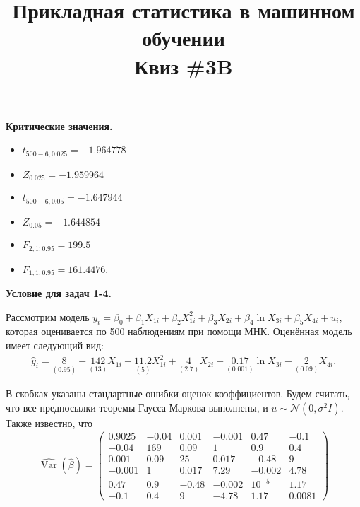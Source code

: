 \documentclass[10pt, a4paper]{extarticle}
\title{{\normalsize Прикладная статистика в машинном обучении} \\ \vspace{0.5em} Квиз \#3B}
\author{\rule{15cm}{0.4pt}}
\DeclareMathOperator{\Var}{Var}
\begin{document}
	
	\maketitle
	
	\begin{center}
		{\large \textbf{Критические значения.}}
		\begin{multicols}{3}
			\begin{itemize}
				\item $t_{500-6; 0.025} = -1.964778$
				\item $Z_{0.025} = -1.959964$
				\item $t_{500-6, 0.05} = -1.647944$
				\item $Z_{0.05} = -1.644854$
				\item $F_{2, 1; 0.95} = 199.5$
				\item $F_{1, 1; 0.95} = 161.4476$.
			\end{itemize}
		\end{multicols}	
	\end{center}
	\vspace{1em}
	
	\begin{center}
	{\large \textbf{Условие для задач 1-4.}}
	\end{center}
	
	Рассмотрим модель $y_i = \beta_0 + \beta_1X_{1i} + \beta_2X^2_{1i} + \beta_3X_{2i} + \beta_4\ln X_{3i} + \beta_5X_{4i} + u_i$, которая оценивается по 500 наблюдениям при помощи МНК. Оценённая модель имеет следующий вид:
	\begin{align*}
		\hat{y}_i = \underset{(0.95)}{8} - \underset{(13)}{142}X_{1i} + \underset{(5)}{11.2}X^2_{1i} + \underset{(2.7)}{4}X_{2i} + \underset{(0.001)}{0.17}\ln X_{3i} - \underset{(0.09)}{2}X_{4i}.
	\end{align*}
	
	В скобках указаны стандартные ошибки оценок коэффициентов. Будем считать, что все предпосылки теоремы Гаусса-Маркова выполнены, и $u \sim \mathcal{N}(0, \sigma^2I)$. Также известно, что
	\[
	\hat{\Var}(\hat{\beta}) = \begin{pmatrix}
		0.9025 & -0.04 & 0.001 & -0.001  & 0.47 & -0.1 \\
		-0.04  & 169 & 0.09 & 1 & 0.9 & 0.4 \\
		0.001  & 0.09 & 25 & 0.017 & -0.48 & 9 \\
		-0.001 & 1 & 0.017 & 7.29 & -0.002 & 4.78 \\
		0.47 & 0.9 & -0.48 & -0.002 & 10^{-5} & 1.17 \\
		-0.1 & 0.4 & 9 & -4.78 & 1.17 &  0.0081
	\end{pmatrix}
	\]
	\vspace{1em}
	
\end{document}
